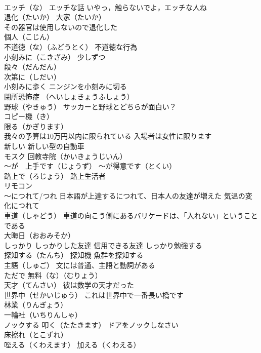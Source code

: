 \documentclass[8pt]{extreport}
\begin{document}
\begin{CJK}{UTF8}{min}
\\	エッチ（な） エッチな話 いやっ，触らないでよ，エッチな人ね
\\	退化（たいか） 大家（たいか）
\\	その器官は使用しないので退化した
\\	個人（こじん）
\\	不道徳（な）（ふどうとく） 不道徳な行為
\\	小刻みに（こきざみ） 少しずつ 
\\	段々（だんだん）
\\	次第に（しだい）
\\	小刻みに歩く ニンジンを小刻みに切る
\\	閉所恐怖症 （へいしょきょうふしょう）
\\	野球（やきゅう） サッカーと野球とどちらが面白い？
\\	コピー機（き）
\\	限る（かぎります） 
\\	我々の予算は10万円以内に限られている 入場者は女性に限ります
\\	新しい 新しい型の自動車
\\	モスク 回教寺院（かいきょうじいん）
\\	～が　上手です（じょうず） ～が得意です（とくい）
\\	路上で（ろじょう） 路上生活者
\\	リモコン
\\	～につれて/つれ 日本語が上達するにつれて、日本人の友達が増えた 気温の変化につれて
\\	車道（しゃどう） 車道の向こう側にあるバリケードは、「入れない」ということである
\\	大晦日（おおみそか）
\\	しっかり しっかりした友達 信用できる友達 しっかり勉強する
\\	探知する（たんち） 探知機 魚群を探知する
\\	主語（しゅご） 文には普通、主語と動詞がある
\\	ただで 無料（な）（むりょう）
\\	天才（てんさい） 彼は数学の天才だった
\\	世界中（せかいじゅう） これは世界中で一番長い橋です
\\	林業（りんぎょう）
\\	一輪社（いちりんしゃ）
\\	ノックする 叩く（たたきます） ドアをノックしなさい
\\	床擦れ（とこずれ）
\\	咥える（くわえます） 加える（くわえる） 

\end{CJK}
\end{document}

